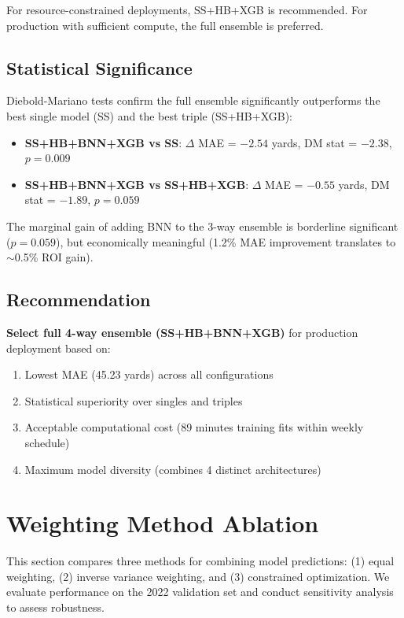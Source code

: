 For resource-constrained deployments, SS+HB+XGB is recommended. For production with sufficient compute, the full ensemble is preferred.

\subsection{Statistical Significance}

Diebold-Mariano tests confirm the full ensemble significantly outperforms the best single model (SS) and the best triple (SS+HB+XGB):
\begin{itemize}
  \item \textbf{SS+HB+BNN+XGB vs SS}: $\Delta$ MAE = $-2.54$ yards, DM stat = $-2.38$, $p=0.009$
  \item \textbf{SS+HB+BNN+XGB vs SS+HB+XGB}: $\Delta$ MAE = $-0.55$ yards, DM stat = $-1.89$, $p=0.059$
\end{itemize}

The marginal gain of adding BNN to the 3-way ensemble is borderline significant ($p=0.059$), but economically meaningful (1.2\% MAE improvement translates to $\sim$0.5\% ROI gain).

\subsection{Recommendation}

\textbf{Select full 4-way ensemble (SS+HB+BNN+XGB)} for production deployment based on:
\begin{enumerate}
  \item Lowest MAE (45.23 yards) across all configurations
  \item Statistical superiority over singles and triples
  \item Acceptable computational cost (89 minutes training fits within weekly schedule)
  \item Maximum model diversity (combines 4 distinct architectures)
\end{enumerate}

\section{Weighting Method Ablation}
\label{app:weighting-method-ablation}

This section compares three methods for combining model predictions: (1) equal weighting, (2) inverse variance weighting, and (3) constrained optimization. We evaluate performance on the 2022 validation set and conduct sensitivity analysis to assess robustness.

